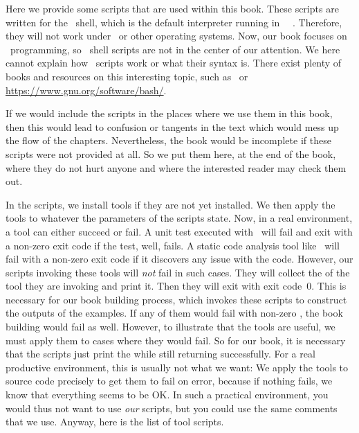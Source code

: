 %
%
%
%
%
%
%
%
%
%
Here we provide some scripts that are used within this book.
These scripts are written for the \bash\ shell, which is the default interpreter running in \ubuntu\ \linux\ .
Therefore, they will not work under \windows\ or other operating systems.
Now, our book focuses on \python\ programming, so \bash\ shell scripts are not in the center of our attention.
We here cannot explain how \bash\ scripts work or what their syntax is.
There exist plenty of books and resources on this interesting topic, such as~\cite{NR2005LTBSUSPCB3,Z2017MB,BN2018BC} or \url{https://www.gnu.org/software/bash/}.

If we would include the scripts in the places where we use them in this book, then this would lead to confusion or tangents in the text which would mess up the flow of the chapters.
Nevertheless, the book would be incomplete if these scripts were not provided at all.
So we put them here, at the end of the book, where they do not hurt anyone and where the interested reader may check them out.

In the scripts, we install tools if they are not yet installed.
We then apply the tools to whatever the parameters of the scripts state.
Now, in a real environment, a tool can either succeed or fail.
A unit test executed with \pytest\ will fail and exit with a non-zero exit code if the test, well, fails.
A static code analysis tool like \ruff\ will fail with a non-zero exit code if it discovers any issue with the code.
However, our scripts invoking these tools will \emph{not} fail in such cases.
They will collect the  of the tool they are invoking and print it.
Then they will exit with exit code~0.
This is necessary for our book building process, which invokes these scripts to construct the outputs of the examples.
If any of them would fail with non-zero , the book building would fail as well.
However, to illustrate that the tools are useful, we must apply them to cases where they would fail.
So for our book, it is necessary that the scripts just print the  while still returning successfully.
For a real productive environment, this is usually not what we want:
We apply the tools to source code precisely to get them to fail on error, because if nothing fails, we know that everything seems to be OK.
In such a practical environment, you would thus not want to use \emph{our} scripts, but you could use the same comments that we use.
Anyway, here is the list of tool scripts.

